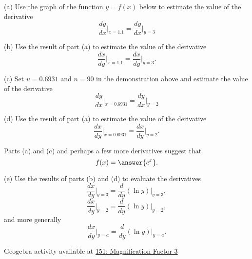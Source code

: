 \documentclass{ximera}
\begin{document}
\begin{example}   \label{Ex:LDfjbbrt}

(a) Use the graph of the function $y=f(x)$ below to estimate the value of the derivative
\[
    \frac{dy}{dx}\Big|_{x=1.1} =  \frac{dy}{dx}\Big|_{y=3}
\]

(b) Use the result of part (a) to estimate the value of the derivative 
\[
      \frac{dx}{dy}\Big|_{x=1.1} = \frac{dx}{dy}\Big|_{y=3} .
\]

\begin{onlineOnly}
    \begin{center}
\end{center}
\end{onlineOnly}

(c) Set $u=0.6931$ and $n=90$ in the demonstration above and estimate the value of the derivative
\[
    \frac{dy}{dx}\Big|_{x=0.6931} = \frac{dy}{dx}\Big|_{y=2}
\]

(d) Use the result of part (a) to estimate the value of the derivative 
\[
      \frac{dx}{dy}\Big|_{x=0.6931} = \frac{dx}{dy}\Big|_{y=2} .
\]

\begin{question}  \label{Q:dfrr4f}
Parts (a) and (c) and perhaps a few more derivatives suggest that
\[
     f(x) = \answer{e^x} .
\]
\end{question}

(e) Use the results of parts (b) and (d) to evaluate the derivatives
\[
         \frac{dx}{dy}\Big|_{y=3} = \frac{d}{dy}\left(  \ln y  \right)\Big|_{y=3} ,
\]
\[
         \frac{dx}{dy}\Big|_{y=2} = \frac{d}{dy}\left(  \ln y  \right)\Big|_{y=2}  ,
\]
and more generally
\[
             \frac{dx}{dy}\Big|_{y=a} = \frac{d}{dy}\left(  \ln y  \right)\Big|_{y=a} . 
\]



Geogebra activity available at \href{https://www.desmos.com/calculator/nnshzdh6jp}{151: Magnification Factor 3}

\end{example}
\end{document}
